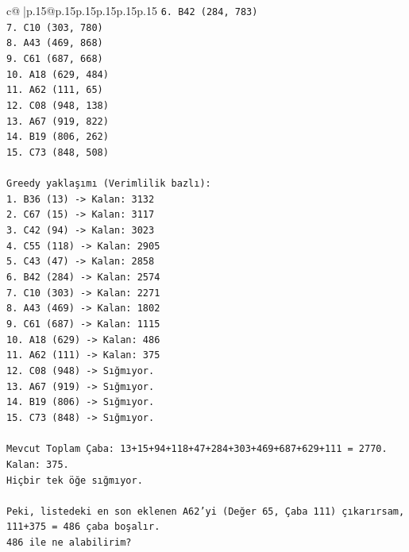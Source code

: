 \documentclass{article}
\begin{document}
{\begin{supertabular}{c@{$\;$}|p{.15\linewidth}@{}p{.15\linewidth}p{.15\linewidth}p{.15\linewidth}p{.15\linewidth}p{.15\linewidth}}
{{{\texttt{6. B42 (284, 783)} \\
\texttt{7. C10 (303, 780)} \\
\texttt{8. A43 (469, 868)} \\
\texttt{9. C61 (687, 668)} \\
\texttt{10. A18 (629, 484)} \\
\texttt{11. A62 (111, 65)} \\
\texttt{12. C08 (948, 138)} \\
\texttt{13. A67 (919, 822)} \\
\texttt{14. B19 (806, 262)} \\
\texttt{15. C73 (848, 508)} \\
\\ 
\texttt{Greedy yaklaşımı (Verimlilik bazlı):} \\
\texttt{1. B36 (13) {-}> Kalan: 3132} \\
\texttt{2. C67 (15) {-}> Kalan: 3117} \\
\texttt{3. C42 (94) {-}> Kalan: 3023} \\
\texttt{4. C55 (118) {-}> Kalan: 2905} \\
\texttt{5. C43 (47) {-}> Kalan: 2858} \\
\texttt{6. B42 (284) {-}> Kalan: 2574} \\
\texttt{7. C10 (303) {-}> Kalan: 2271} \\
\texttt{8. A43 (469) {-}> Kalan: 1802} \\
\texttt{9. C61 (687) {-}> Kalan: 1115} \\
\texttt{10. A18 (629) {-}> Kalan: 486} \\
\texttt{11. A62 (111) {-}> Kalan: 375} \\
\texttt{12. C08 (948) {-}> Sığmıyor.} \\
\texttt{13. A67 (919) {-}> Sığmıyor.} \\
\texttt{14. B19 (806) {-}> Sığmıyor.} \\
\texttt{15. C73 (848) {-}> Sığmıyor.} \\
\\ 
\texttt{Mevcut Toplam Çaba: 13+15+94+118+47+284+303+469+687+629+111 = 2770.} \\
\texttt{Kalan: 375.} \\
\texttt{Hiçbir tek öğe sığmıyor.} \\
\\ 
\texttt{Peki, listedeki en son eklenen A62'yi (Değer 65, Çaba 111) çıkarırsam, 111+375 = 486 çaba boşalır.} \\
\texttt{486 ile ne alabilirim?} \\
}}}
\end{supertabular}}
\end{document}
